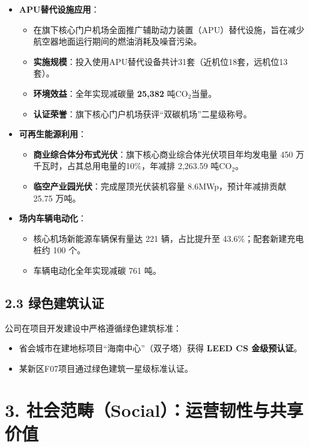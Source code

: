 \documentclass[a4paper,12pt]{article}
\begin{document}
\begin{itemize}
    \item \textbf{APU替代设施应用}：
    \begin{itemize}
        \item 在旗下核心门户机场全面推广辅助动力装置（APU）替代设施，旨在减少航空器地面运行期间的燃油消耗及噪音污染。
        \item \textbf{实施规模}：投入使用APU替代设备共计31套（近机位18套，远机位13套）。
        \item \textbf{环境效益}：全年实现减碳量 \textbf{25,382} 吨CO$_2$当量。
        \item \textbf{认证荣誉}：旗下核心门户机场获评“双碳机场”二星级称号。
    \end{itemize}
    
    \item \textbf{可再生能源利用}：
    \begin{itemize}
        \item \textbf{商业综合体分布式光伏}：旗下核心商业综合体光伏项目年均发电量 450 万千瓦时，占其总用电量的10\%，年减排 2,263.59 吨CO$_2$。
        \item \textbf{临空产业园光伏}：完成屋顶光伏装机容量 8.6MWp，预计年减排贡献 25.75 万吨。
    \end{itemize}

    \item \textbf{场内车辆电动化}：
    \begin{itemize}
        \item 核心机场新能源车辆保有量达 221 辆，占比提升至 43.6\%；配套新建充电桩约 100 个。
        \item 车辆电动化全年实现减碳 761 吨。
    \end{itemize}
\end{itemize}

\subsection{2.3 绿色建筑认证}

公司在项目开发建设中严格遵循绿色建筑标准：
\begin{itemize}
    \item 省会城市在建地标项目“海南中心”（双子塔）获得 \textbf{LEED CS 金级预认证}。
    \item 某新区F07项目通过绿色建筑一星级标准认证。
\end{itemize}

\section{3. 社会范畴（Social）：运营韧性与共享价值}
\end{document}

